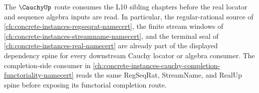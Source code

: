 The $\CauchyUp$ route consumes the L10 sibling chapters before the real locator and sequence algebra inputs are read. In particular, the regular-rational source of \autoref{ch:concrete-instances-regseqrat-namecert}, the finite stream windows of \autoref{ch:concrete-instances-streamname-namecert}, and the terminal seal of \autoref{ch:concrete-instances-real-namecert} are already part of the displayed dependency spine for every downstream Cauchy locator or algebra consumer. The completion-side consumer in \autoref{ch:concrete-instances-cauchy-completion-functoriality-namecert} reads the same RegSeqRat, StreamName, and RealUp spine before exposing its functorial completion route.
